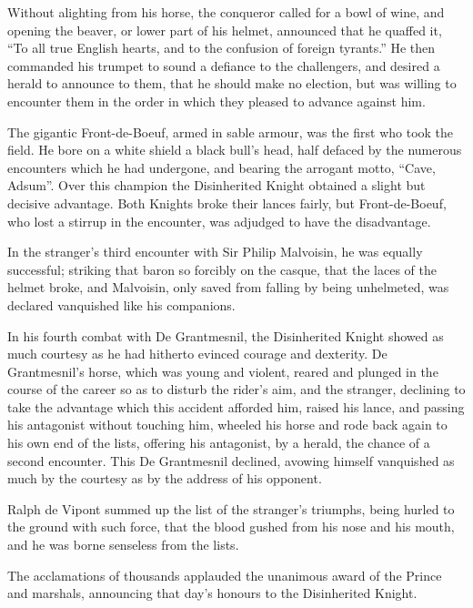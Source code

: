 Without alighting from his horse, the conqueror called for a bowl of
wine, and opening the beaver, or lower part of his helmet, announced
that he quaffed it, ``To all true English hearts, and to the confusion
of foreign tyrants.'' He then commanded his trumpet to sound a defiance
to the challengers, and desired a herald to announce to them, that he
should make no election, but was willing to encounter them in the order
in which they pleased to advance against him.

The gigantic Front-de-Boeuf, armed in sable armour, was the first who
took the field. He bore on a white shield a black bull's head, half
defaced by the numerous encounters which he had undergone, and bearing
the arrogant motto, ``Cave, Adsum''. Over this champion the Disinherited
Knight obtained a slight but decisive advantage. Both Knights broke
their lances fairly, but Front-de-Boeuf, who lost a stirrup in the
encounter, was adjudged to have the disadvantage.

In the stranger's third encounter with Sir Philip Malvoisin, he was
equally successful; striking that baron so forcibly on the casque, that
the laces of the helmet broke, and Malvoisin, only saved from falling by
being unhelmeted, was declared vanquished like his companions.

In his fourth combat with De Grantmesnil, the Disinherited Knight showed
as much courtesy as he had hitherto evinced courage and dexterity. De
Grantmesnil's horse, which was young and violent, reared and plunged in
the course of the career so as to disturb the rider's aim, and the
stranger, declining to take the advantage which this accident afforded
him, raised his lance, and passing his antagonist without touching him,
wheeled his horse and rode back again to his own end of the lists,
offering his antagonist, by a herald, the chance of a second encounter.
This De Grantmesnil declined, avowing himself vanquished as much by the
courtesy as by the address of his opponent.

Ralph de Vipont summed up the list of the stranger's triumphs, being
hurled to the ground with such force, that the blood gushed from his
nose and his mouth, and he was borne senseless from the lists.

The acclamations of thousands applauded the unanimous award of the
Prince and marshals, announcing that day's honours to the Disinherited
Knight.
